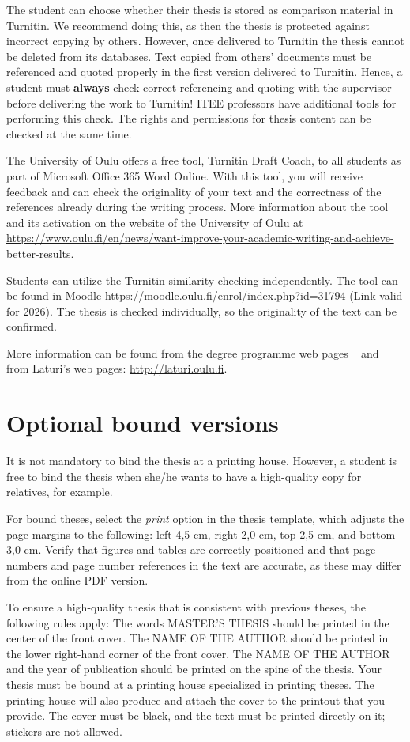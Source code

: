 The student can choose whether their thesis is stored as comparison material
in Turnitin. We recommend doing this, as then
the thesis is protected against incorrect copying by others. However,
once delivered to Turnitin the thesis cannot be deleted from its
databases. Text copied from others’ documents must be referenced
and quoted properly in the first version delivered to Turnitin.
Hence, a student must \textbf{always} check correct referencing and
quoting with the supervisor before delivering the work to Turnitin!
ITEE professors have additional tools for performing this check. The
rights and permissions for thesis content can be checked at the same time.

The University of Oulu offers a free tool, Turnitin Draft Coach, to
all students as part of Microsoft Office 365 Word Online. With this
tool, you will receive feedback and can check the originality of your
text and the correctness of the references already during the writing
process.  More information about the tool and its activation on the
website of the University of Oulu at
\url{https://www.oulu.fi/en/news/want-improve-your-academic-writing-and-achieve-better-results}.

Students can utilize the Turnitin similarity checking independently.
The tool can be found in Moodle \url{https://moodle.oulu.fi/enrol/index.php?id=31794} (Link valid for 2026). The thesis is checked individually, so the originality of the text can be confirmed.

More information can be found from the degree programme web pages
~\cite{mscstudies} and from Laturi’s web pages: \url{http://laturi.oulu.fi}.

\section{Optional bound versions}
\label{boundversion}
It is not mandatory to bind the thesis at a printing house. However, a
student is free to bind the thesis when she/he wants to have a
high-quality copy for relatives, for example.

For bound theses, select the \textit{print} option in the thesis
template, which adjusts the page margins to the following: left 4,5
cm, right 2,0 cm, top 2,5 cm, and bottom 3,0 cm. Verify that figures
and tables are correctly positioned and that page numbers and page
number references in the text are accurate, as these may differ from
the online PDF version. 

To ensure a high-quality thesis that is consistent with previous
theses, the following rules apply: The words MASTER’S THESIS should be
printed in the center of the front cover. The NAME OF THE AUTHOR
should be printed in the lower right-hand corner of the front
cover. The NAME OF THE AUTHOR and the year of publication should be
printed on the spine of the thesis. Your thesis must be bound at a
printing house specialized in printing theses. The printing house will
also produce and attach the cover to the printout that you
provide. The cover must be black, and the text must be printed
directly on it; stickers are not allowed.

